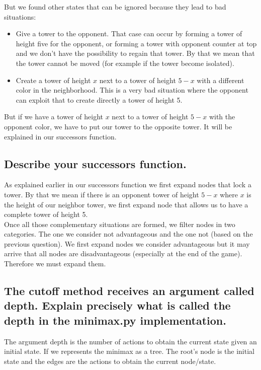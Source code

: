 \documentclass[10pt,a4paper]{article}
\begin{document}
But we found other states that can be ignored because they lead to bad situations:

\begin{itemize}
\item Give a tower to the opponent. That case can occur by forming a tower of height five for the opponent, or forming a tower with opponent counter at top and we don't have the possibility to regain that tower. By that we mean that the tower cannot be moved (for example if the tower become isolated).
\item Create a tower of height $x$ next to a tower of height $5-x$ with a different color in the neighborhood. This is a very bad situation where the opponent can exploit that to create directly a tower of height 5. 
\end{itemize}

But if we have a tower of height $x$ next to a tower of height $5-x$ with the opponent color, we have to put our tower to the opposite tower. It will be explained in our successors function.

\subsection{Describe your successors function.}

As explained earlier in our successors function we first expand nodes that lock a tower. By that we mean if there is an opponent tower of height $5-x$ where $x$ is the height of our neighbor tower, we first expand node that allows us to have a complete tower of height 5. \\
Once all those complementary situations are formed, we filter nodes in two categories. The one we consider not advantageous and the one not (based on the previous question). We first expand nodes we consider advantageous but it may arrive that all nodes are disadvantageous (especially at the end of the game). Therefore we must expand them.


\subsection{The cutoff method receives an argument called depth. Explain precisely what is called the depth in the minimax.py implementation.}

The argument depth is the number of actions to obtain the current state given an initial state. If we represents the minimax as a tree. The root's node is the initial state and the edges are the actions to obtain the current node/state.
\end{document}
